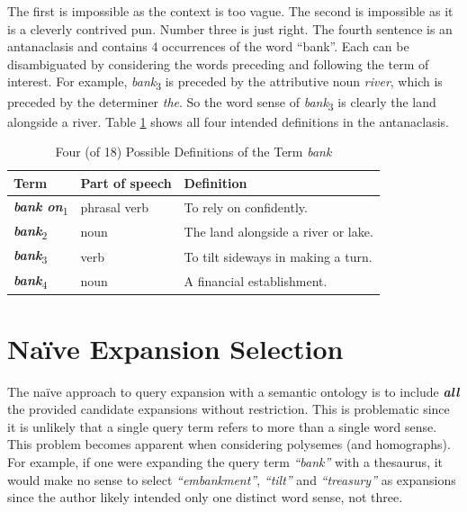 The first is impossible as the context is too vague. The second is impossible as it is a cleverly contrived pun. Number three is just right. The fourth sentence is an antanaclasis and contains 4 occurrences of the word ``bank''. Each can be disambiguated by considering the words preceding and following the term of interest. For example, \textit{bank}\textsubscript{3} is preceded by the attributive noun \textit{river}, which is preceded by the determiner \textit{the}. So the word sense of \textit{bank}\textsubscript{3} is clearly the land alongside a river. Table \ref{bank-definitions} shows all four intended definitions in the antanaclasis.


\begin{table}[h]
\centering
\begin{tabular}{|l|l|l|}
\hline
Term    & Part of speech & Definition                          \\ \hline
\textbf{\textit{bank on}}\textsubscript{1} & phrasal verb & To rely on confidently.             \\
\textbf{\textit{bank}}\textsubscript{2}    & noun & The land alongside a river or lake. \\
\textbf{\textit{bank}}\textsubscript{3}    & verb & To tilt sideways in making a turn.  \\
\textbf{\textit{bank}}\textsubscript{4}    & noun & A financial establishment.          \\ \hline
\end{tabular}
\caption{Four (of 18) Possible Definitions of the Term \textit{bank}}
\label{bank-definitions}
\end{table}


\section{Na{\"i}ve Expansion Selection} \label{standardTS}
The na{\"i}ve approach to query expansion with a semantic ontology is to include \textit{\textbf{all}} the provided candidate expansions without restriction. This is problematic since it is unlikely that a single query term refers to more than a single word sense. This problem becomes apparent when considering polysemes (and homographs). For example, if one were expanding the query term \textit{``bank''} with a thesaurus, it would make no sense to select \textit{``embankment''}, \textit{``tilt''} and \textit{``treasury''} as expansions since the author likely intended only one distinct word sense, not three.

